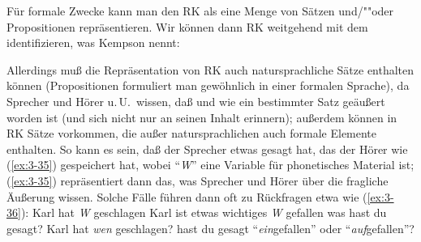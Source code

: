 \documentclass[output=paper]{langsci/langscibook}
\begin{document}
Für formale Zwecke kann man den RK als eine Menge von Sätzen und/""oder Propositionen repräsentieren. Wir können dann RK weitgehend mit dem identifizieren, was Kempson  nennt:
\begin{exe}
\settowidth{}
 
\end{exe}
\largerpage
Allerdings muß die Repräsentation von RK auch natursprachliche Sätze
enthalten können (Propositionen formuliert man gewöhnlich in einer
formalen Sprache), da Sprecher und Hörer u.\,U.\ wissen, daß und wie
ein bestimmter Satz geäußert worden ist (und sich nicht nur an seinen
Inhalt erinnern); außerdem können in RK Sätze vorkommen, die außer
natursprachlichen auch formale Elemente enthalten. So kann es sein,
daß der Sprecher etwas gesagt hat, das der Hörer wie (\ref{ex:3-35}) gespeichert
  hat, wobei "`\textit{W}"' eine Variable für phonetisches Material ist; (\ref{ex:3-35})
  repräsentiert dann das, was Sprecher und Hörer über die fragliche
  Äußerung wissen. Solche Fälle führen dann oft zu Rückfragen etwa
  wie (\ref{ex:3-36}):
\eal \label{ex:3-35}
\ex
\label{ex:3-35a}
Karl hat \textit{W} geschlagen
\ex
\label{ex:3-35b}
Karl ist etwas wichtiges \textit{W} gefallen
\zl
\eal \label{ex:3-36}
\ex
\label{ex:3-36a}
was hast du gesagt? Karl hat \textit{wen} geschlagen?
\ex
\label{ex:3-36b}
hast du gesagt "`\textit{ein}gefallen"' oder "`\textit{auf}\hspace{-0.15em}gefallen"'?
\zl
\end{document}
